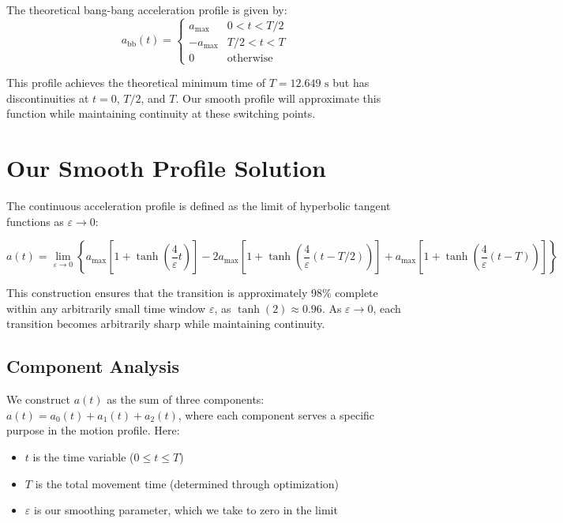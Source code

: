 \documentclass[12pt,a4paper]{article}
\begin{document}
The theoretical bang-bang acceleration profile is given by:
\begin{equation}
a_{\text{bb}}(t) = \begin{cases}
a_{\text{max}} & 0 < t < T/2 \\
-a_{\text{max}} & T/2 < t < T \\
0 & \text{otherwise}
\end{cases}
\end{equation}

This profile achieves the theoretical minimum time of $T = 12.649\text{ s}$ but has discontinuities at $t = 0$, $T/2$, and $T$. Our smooth profile will approximate this function while maintaining continuity at these switching points.

\newpage
\section{Our Smooth Profile Solution}
The continuous acceleration profile is defined as the limit of hyperbolic tangent functions as $\varepsilon \to 0$:

\begin{equation}
a(t) = \lim_{\varepsilon \to 0} \left\{ a_{\text{max}}[1 + \tanh(\frac{4}{\varepsilon}t)] - 2a_{\text{max}}[1 + \tanh(\frac{4}{\varepsilon}(t-T/2))] + a_{\text{max}}[1 + \tanh(\frac{4}{\varepsilon}(t-T))] \right\}
\end{equation}

This construction ensures that the transition is approximately 98\% complete within any arbitrarily small time window $\varepsilon$, as $\tanh(2) \approx 0.96$. As $\varepsilon \to 0$, each transition becomes arbitrarily sharp while maintaining continuity.

\subsection{Component Analysis}
We construct $a(t)$ as the sum of three components: $a(t) = a_0(t) + a_1(t) + a_2(t)$, where each component serves a specific purpose in the motion profile. Here:
\begin{itemize}
\item $t$ is the time variable ($0 \leq t \leq T$)
\item $T$ is the total movement time (determined through optimization)
\item $\varepsilon$ is our smoothing parameter, which we take to zero in the limit
\end{itemize}
\end{document}
